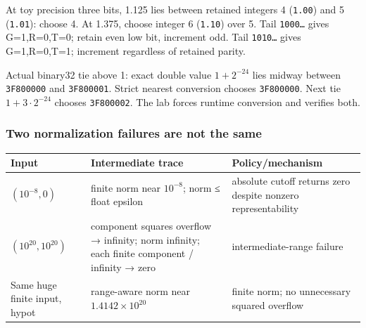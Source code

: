 \hypertarget{appendix-92ff77d4dfdc-rounding-trace}{}

At toy precision three bits, 1.125 lies between retained integers 4 (\texttt{1.00}) and 5 (\texttt{1.01}): choose 4. At 1.375, choose integer 6 (\texttt{1.10}) over 5. Tail \texttt{1000…} gives G=1,R=0,T=0; retain even low bit, increment odd. Tail \texttt{1010…} gives G=1,R=0,T=1; increment regardless of retained parity.

Actual binary32 tie above 1: exact double value \(1+2^{-24}\) lies midway between \texttt{3F800000} and \texttt{3F800001}. Strict nearest conversion chooses \texttt{3F800000}. Next tie \(1+3\cdot2^{-24}\) chooses \texttt{3F800002}. The lab forces runtime conversion and verifies both.

\subsubsection{Two normalization failures are not the same}\label{appendix-92ff77d4dfdc-two-normalization-failures-are-not-the-same}

\hypertarget{appendix-92ff77d4dfdc-two-normalization-failures-are-not-the-same}{}

{\def\LTcaptype{none} %
\begin{longtable}[]{@{}
  >{\raggedright\arraybackslash}p{}
  >{\raggedright\arraybackslash}p{}
  >{\raggedright\arraybackslash}p{}@{}}
\toprule\noalign{}
\begin{minipage}[b]{\linewidth}\raggedright
Input
\end{minipage} & \begin{minipage}[b]{\linewidth}\raggedright
Intermediate trace
\end{minipage} & \begin{minipage}[b]{\linewidth}\raggedright
Policy/mechanism
\end{minipage} \\
\midrule\noalign{}
\endhead
\bottomrule\noalign{}
\endlastfoot
\((10^{-8},0)\) & finite norm near \(10^{-8}\); norm ≤ float epsilon & absolute cutoff returns zero despite nonzero representability \\
\((10^{20},10^{20})\) & component squares overflow → infinity; norm infinity; each finite component / infinity → zero & intermediate-range failure \\
Same huge finite input, hypot & range-aware norm near \(1.4142\times10^{20}\) & finite norm; no unnecessary squared overflow \\
\end{longtable}
}

